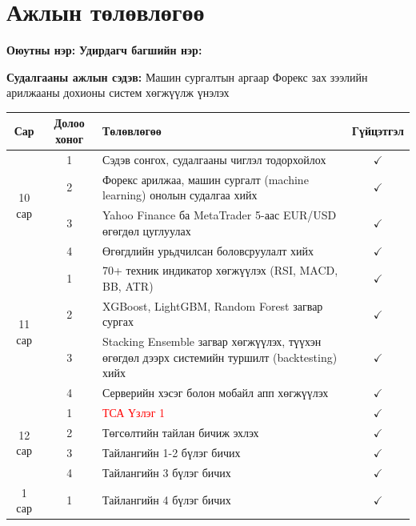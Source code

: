 \chapter*{Ажлын төлөвлөгөө}
\label{ch:plan}

\noindent\textbf{Оюутны нэр:} \authorShort \hfill \textbf{Удирдагч багшийн нэр:} \supervisorname

\noindent\textbf{Судалгааны ажлын сэдэв:} Машин сургалтын аргаар Форекс зах зээлийн арилжааны дохионы систем хөгжүүлж үнэлэх

\vspace{0.3cm}

\begin{table}[h!t]
\centering
\begin{tabular}{|c|c|p{7.5cm}|c|}
\hline
\textbf{Сар} & \textbf{Долоо хоног} & \textbf{Төлөвлөгөө} & \textbf{Гүйцэтгэл} \\
\hline
\multirow{4}{*}{10 сар} & 1 & Сэдэв сонгох, судалгааны чиглэл тодорхойлох & $\checkmark$ \\
\cline{2-4}
& 2 & Форекс арилжаа, машин сургалт (machine learning) онолын судалгаа хийх & $\checkmark$ \\
\cline{2-4}
& 3 & Yahoo Finance ба MetaTrader 5-аас EUR/USD өгөгдөл цуглуулах & $\checkmark$ \\
\cline{2-4}
& 4 & Өгөгдлийн урьдчилсан боловсруулалт хийх & $\checkmark$ \\
\hline
\multirow{4}{*}{11 сар} & 1 & 70+ техник индикатор хөгжүүлэх (RSI, MACD, BB, ATR) & $\checkmark$ \\
\cline{2-4}
& 2 & XGBoost, LightGBM, Random Forest загвар сургах & $\checkmark$ \\
\cline{2-4}
& 3 & Stacking Ensemble загвар хөгжүүлэх, түүхэн өгөгдөл дээрх системийн туршилт (backtesting) хийх & $\checkmark$ \\
\cline{2-4}
& 4 & Серверийн хэсэг болон мобайл апп хөгжүүлэх & $\checkmark$ \\
\hline
\multirow{4}{*}{12 сар} & 1 & \textcolor{red}{ТСА Үзлэг 1} & $\checkmark$ \\
\cline{2-4}
& 2 & Төгсөлтийн тайлан бичиж эхлэх & $\checkmark$ \\
\cline{2-4}
& 3 & Тайлангийн 1-2 бүлэг бичих & $\checkmark$ \\
\cline{2-4}
& 4 & Тайлангийн 3 бүлэг бичих & $\checkmark$ \\
\hline
\multirow{4}{*}{1 сар} & 1 & Тайлангийн 4 бүлэг бичих & $\checkmark$ \\

\end{tabular}
\end{table}
